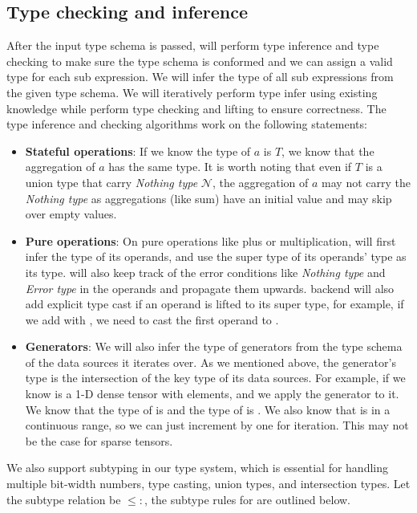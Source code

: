 \documentclass[acmsmall,nonacm]{acmart}\settopmatter{printfolios=true,printccs=false,printacmref=false}
\newcommand{\rhyme}{\text{Rhyme}\xspace}
\begin{document}
\subsection{Type checking and inference}
After the input type schema is passed, \rhyme will perform type inference and type checking to make sure the type schema is conformed and we can assign a valid type for each sub expression. We will infer the type of all sub expressions from the given type schema. We will iteratively perform type infer using existing knowledge while perform type checking and lifting to ensure correctness. The type inference and checking algorithms work on the following statements:
\begin{itemize}
  \item \textbf{Stateful operations}: If we know the type of $a$ is $T$, we know that the aggregation of $a$ has the same type. It is worth noting that even if $T$ is a union type that carry \emph{Nothing type} $\mathcal{N}$, the aggregation of $a$ may not carry the \emph{Nothing type} as aggregations (like sum) have an initial value and may skip over empty values.
  \item \textbf{Pure operations}: On pure operations like plus or multiplication, \rhyme will first infer the type of its operands, and use the super type of its operands' type as its type. \rhyme will also keep track of the error conditions like \emph{Nothing type} and \emph{Error type} in the operands and propagate them upwards. \rhyme backend will also add explicit type cast if an operand is lifted to its super type, for example, if we add  with , we need to cast the first operand to .
  \item \textbf{Generators}: We will also infer the type of generators from the type schema of the data sources it iterates over. As we mentioned above, the generator's type is the intersection of the key type of its data sources. For example, if we know  is a 1-D dense tensor with  elements, and we apply the generator \inline{*} to it. We know that the type of \inline{*} is  and the type of  is . We also know that \inline{*} is in a continuous range, so we can just increment \inline{*} by one for iteration. This may not be the case for sparse tensors.
\end{itemize}
\fi
We also support subtyping in our type system, which is essential for handling multiple bit-width numbers, type casting, union types, and intersection types. Let the subtype relation be $\leq:$, the subtype rules for \rhyme are outlined below.\par
\end{document}
